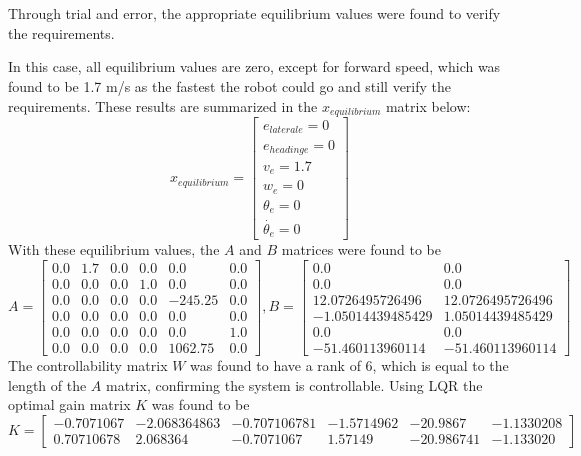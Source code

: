 \documentclass[10pt, letterbox]{article}
\begin{document}
\section{}
\begin{addmargin}[5em]{0em}
Through trial and error, the appropriate equilibrium values were found to verify the requirements. \end{addmargin} In this case, all equilibrium values are zero, except for forward speed, which was found to be 1.7 m/s as the fastest the robot could go and still verify the requirements. These results are summarized in the $x_{equilibrium}$ matrix below:
\begin{equation}
x_{equilibrium} = 
\begin{bmatrix} 
e_{lateral e} = 0 \\ 
e_{heading e} = 0 \\ 
v_{e} = 1.7 \\ 
w_{e} = 0 \\ 
\theta_{e} = 0\\
\dot{\theta_{e}} = 0
\end{bmatrix}
\end{equation}
With these equilibrium values, the $A$ and $B$ matrices were found to be
\begin{equation}
A = 
\begin{bmatrix}
0.0 & 1.7 & 0.0 & 0.0 & 0.0 & 0.0\\0.0 & 0.0 & 0.0 & 1.0 & 0.0 & 0.0\\0.0 & 0.0 & 0.0 & 0.0 & -245.25 & 0.0\\0.0 & 0.0 & 0.0 & 0.0 & 0.0 & 0.0\\0.0 & 0.0 & 0.0 & 0.0 & 0.0 & 1.0\\0.0 & 0.0 & 0.0 & 0.0 & 1062.75 & 0.0
\end{bmatrix},
B = 
\begin{bmatrix}0.0 & 0.0\\0.0 & 0.0\\12.0726495726496 & 12.0726495726496\\-1.05014439485429 & 1.05014439485429\\0.0 & 0.0\\-51.460113960114 & -51.460113960114
\end{bmatrix}
\end{equation}
The controllability matrix $W$ was found to have a rank of 6, which is equal to the length of the $A$ matrix, confirming the system is controllable. Using LQR the optimal gain matrix $K$ was found to be
\begin{equation}
K = 
\begin{bmatrix}
-0.7071067 & -2.068364863 & -0.707106781 & -1.5714962 & -20.9867 & -1.1330208\\0.70710678 & 2.068364 & -0.7071067 & 1.57149 & -20.986741 & -1.133020
\end{bmatrix}
\end{equation}
\end{document}
